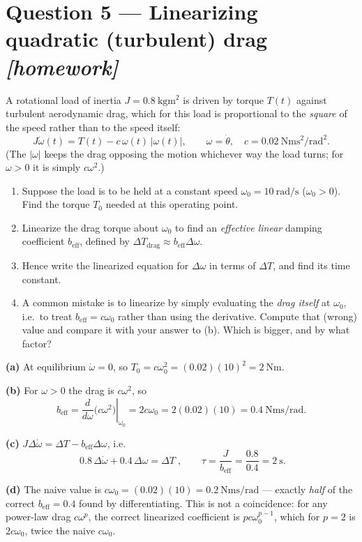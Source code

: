 \documentclass[11pt,a4paper]{article}
\newcommand{\athome}{\hfill{\small\color{fflag}\itshape[homework]}}
\begin{document}
\section*{Question 5 --- Linearizing quadratic (turbulent) drag \athome}

A rotational load of inertia $J=\SI{0.8}{\kilogram\metre\squared}$ is driven by
torque $T(t)$ against turbulent aerodynamic drag, which for this load is
proportional to the \emph{square} of the speed rather than to the speed
itself:
\[
  J\dot\omega(t) = T(t) - c\,\omega(t)\,|\omega(t)|,
  \qquad \omega=\dot\theta,\quad c=\SI{0.02}{\newton\metre\second\squared\per\radian\squared}.
\]
(The $|\omega|$ keeps the drag opposing the motion whichever way the load
turns; for $\omega>0$ it is simply $c\omega^2$.)

\begin{enumerate}[label=(\alph*)]
\item Suppose the load is to be held at a constant speed $\omega_0=\SI{10}{\radian\per\second}$
      ($\omega_0>0$). Find the torque $T_0$ needed at this operating point.
\item Linearize the drag torque about $\omega_0$ to find an \emph{effective
      linear} damping coefficient $b_{\text{eff}}$, defined by
      $\Delta T_{\text{drag}}\approx b_{\text{eff}}\Delta\omega$.
\item Hence write the linearized equation for $\Delta\omega$ in terms of
      $\Delta T$, and find its time constant.
\item A common mistake is to linearize by simply evaluating the \emph{drag
      itself} at $\omega_0$, i.e.\ to treat $b_{\text{eff}}=c\omega_0$ rather
      than using the derivative. Compute that (wrong) value and compare it
      with your answer to (b). Which is bigger, and by what factor?
\end{enumerate}

\begin{solution}
\textbf{(a)} At equilibrium $\dot\omega=0$, so
$T_0=c\omega_0^2=(0.02)(10)^2=\SI{2}{\newton\metre}$.

\medskip
\textbf{(b)} For $\omega>0$ the drag is $c\omega^2$, so
\[
  b_{\text{eff}}=\left.\frac{d}{d\omega}\big(c\omega^2\big)\right|_{\omega_0}
  =2c\omega_0=2(0.02)(10)=\SI{0.4}{\newton\metre\second\per\radian}.
\]

\medskip
\textbf{(c)} $J\Delta\dot\omega=\Delta T-b_{\text{eff}}\Delta\omega$, i.e.
\[
  \boxed{\;0.8\,\Delta\dot\omega+0.4\,\Delta\omega=\Delta T\;},
  \qquad \tau=\frac{J}{b_{\text{eff}}}=\frac{0.8}{0.4}=\SI{2}{\second}.
\]

\medskip
\textbf{(d)} The naive value is $c\omega_0=(0.02)(10)=\SI{0.2}{\newton\metre\second\per\radian}$
--- exactly \emph{half} of the correct $b_{\text{eff}}=0.4$ found by
differentiating. This is not a coincidence: for any power-law drag
$c\omega^{p}$, the correct linearized coefficient is $pc\omega_0^{p-1}$, which
for $p=2$ is $2c\omega_0$, twice the naive $c\omega_0$.
\end{solution}
\end{document}
